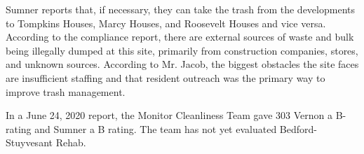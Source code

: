 Sumner reports that, if necessary, they can take the trash from the developments to Tompkins Houses, Marcy Houses, and Roosevelt Houses and vice versa. According to the compliance report, there are external sources of waste and bulk being illegally dumped at this site, primarily from construction companies, stores, and unknown sources. According to Mr. Jacob, the biggest obstacles the site faces are insufficient staffing and that resident outreach was the primary way to improve trash management. 



In a June 24, 2020 report, the Monitor Cleanliness Team gave 303 Vernon a B- rating and Sumner a B rating. The team has not yet evaluated Bedford-Stuyvesant Rehab.